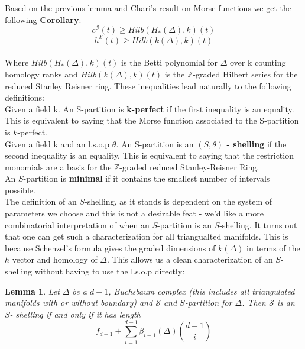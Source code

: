 \documentclass[a4paper]{article}
\newtheorem{lemma}[theorem]{Lemma}
\begin{document}
{Based on the previous lemma and Chari's result on Morse functions we get the following \textbf{Corollary}: \\

$$c^\mathcal{S}(t) \geq Hilb(H_*(\Delta),k)(t)$$ $$h^\mathcal{S}(t) \geq Hilb(k(\Delta), k)(t) $$ \\

Where $Hilb(H_*(\Delta),k)(t)$ is the Betti polynomial for $\Delta$ over k counting homology ranks and $Hilb(k(\Delta), k)(t)$ is the $\mathbb{Z}$-graded Hilbert series for the reduced Stanley Reisner ring. These inequalities lead naturally to the following definitions: \\

Given a field k. An S-partition is \textbf{k-perfect} if the first inequality is an equality. This is equivalent to saying that the Morse function associated to the S-partition is $k$-perfect. \\

Given a field k and an l.s.o.p $\theta$. An S-partition is an \textbf{$(S,\theta)$ - shelling} if the second inequality is an equality. This is equivalent to saying that the restriction monomials are a basis for the $\mathbb{Z}$-graded reduced Stanley-Reisner Ring. \\

An $S$-partition is \textbf{minimal} if it contains the smallest number of intervals possible. \\

The definition of an $S$-shelling, as it stands is dependent on the system of parameters we choose and this is not a desirable feat - we'd like a more combinatorial interpretation of when an $S$-partition is an $S$-shelling. It turns out that one can get such a characterization for all triangualted manifolds. This is because Schenzel's formula gives the graded dimensions of $k(\Delta)$ in terms of the $h$ vector and homology of $\Delta$. This allows us a clean characterization of an $S$-shelling without having to use the l.s.o.p directly:

\begin{lemma}
Let $\Delta$ be a $d-1$, Buchsbaum complex (this includes all triangulated manifolds with or without boundary) and $\mathcal{S}$ and $S$-partition for $\Delta$. Then $\mathcal{S}$ is an $S$- shelling if and only if it has length $$f_{d-1} + \sum_{i=1}^{d-1} \beta_{i-1}(\Delta) {d-1 \choose i}$$

\end{lemma}

}
\end{document}
